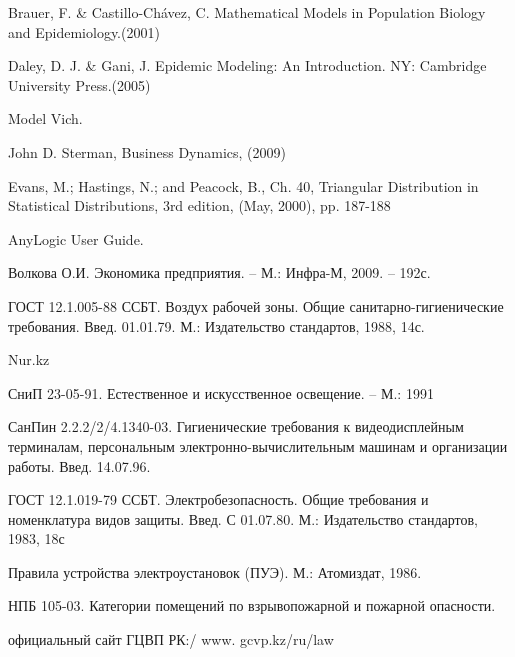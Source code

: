 \begin{thebibliography}{99}
Brauer, F. & Castillo-Chávez, C. Mathematical Models in Population Biology and Epidemiology.(2001)

Daley, D. J. & Gani, J. Epidemic Modeling: An Introduction. NY: Cambridge University Press.(2005)

Model Vich.

John D. Sterman, Business Dynamics, (2009)

Evans, M.; Hastings, N.; and Peacock, B., Ch. 40, Triangular Distribution in Statistical Distributions, 3rd edition, (May, 2000), pp. 187-188

AnyLogic User Guide.

Волкова О.И. Экономика предприятия. – М.: Инфра-М, 2009. – 192с.

ГОСТ 12.1.005-88 ССБТ. Воздух рабочей зоны. Общие санитарно-гигиенические требования. Введ. 01.01.79. М.: Издательство стандартов, 1988, 14с.

Nur.kz

СниП 23-05-91. Естественное и искусственное освещение. – М.: 1991

СанПин 2.2.2/2/4.1340-03. Гигиенические требования  к видеодисплейным терминалам, персональным электронно-вычислительным машинам и организации работы. Введ. 14.07.96.

ГОСТ 12.1.019-79 ССБТ. Электробезопасность. Общие требования и номенклатура видов защиты. Введ. С 01.07.80. М.: Издательство стандартов, 1983, 18с

Правила устройства электроустановок (ПУЭ). М.: Атомиздат, 1986.

НПБ 105-03. Категории помещений по взрывопожарной и пожарной опасности.

официальный сайт ГЦВП РК:/ www. gcvp.kz/ru/law

\end{thebibliography}


